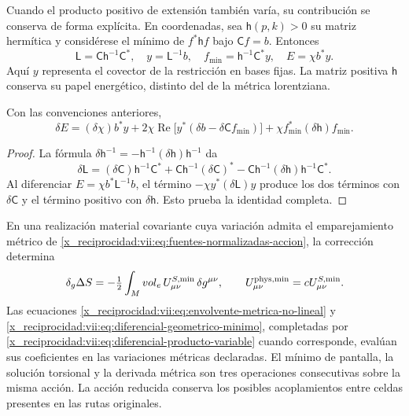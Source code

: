 Cuando el producto positivo de extensión también varía, su
contribución se conserva de forma explícita. En coordenadas, sea
\(\mathsf h(p,k)>0\) su matriz hermítica y considérese el mínimo
de \(f^*\mathsf h f\) bajo \(\mathsf C f=b\). Entonces
\begin{equation}
 \mathsf L=\mathsf C\mathsf h^{-1}\mathsf C^*,\quad
 y=\mathsf L^{-1}b,\quad
 f_{\min}=\mathsf h^{-1}\mathsf C^*y,\quad
 E=\chi b^*y.
 \label{x_reciprocidad:vii:eq:minimo-producto-variable}
\end{equation}
Aquí \(y\) representa el covector de la restricción en bases
fijas. La matriz positiva \(\mathsf h\) conserva su papel
energético, distinto del de la métrica lorentziana.

\begin{lemma}
\label{x_reciprocidad:vii:lem:producto-variable-extension}
Con las convenciones anteriores,
\begin{equation}
 \delta E=(\delta\chi)b^*y
   +2\chi\operatorname{Re}\bigl[y^*(\delta b-\delta\mathsf C f_{\min})\bigr]
   +\chi f_{\min}^*(\delta\mathsf h)f_{\min}.
 \label{x_reciprocidad:vii:eq:diferencial-producto-variable}
\end{equation}
\end{lemma}
\begin{proof}
La fórmula \(\delta\mathsf h^{-1}
=-\mathsf h^{-1}(\delta\mathsf h)\mathsf h^{-1}\) da
\[
 \delta\mathsf L=(\delta\mathsf C)\mathsf h^{-1}\mathsf C^*
 +\mathsf C\mathsf h^{-1}(\delta\mathsf C)^*
 -\mathsf C\mathsf h^{-1}(\delta\mathsf h)
                              \mathsf h^{-1}\mathsf C^*.
\]
Al diferenciar \(E=\chi b^*\mathsf L^{-1}b\), el término
\(-\chi y^*(\delta\mathsf L)y\) produce los dos términos
con \(\delta\mathsf C\) y el término positivo con
\(\delta\mathsf h\). Esto prueba la identidad completa.
\end{proof}

En una realización material covariante cuya variación admita el
emparejamiento métrico de
\eqref{x_reciprocidad:vii:eq:fuentes-normalizadas-accion}, la corrección determina
\begin{equation}
 \delta_g\Delta S
 =-\tfrac12\int_M\operatorname{vol}_e\,
          \mathcal U^{S,\min}_{\mu\nu}\,\delta g^{\mu\nu},
 \qquad U^{\rm phys,\min}_{\mu\nu}
                      =c\mathcal U^{S,\min}_{\mu\nu}.
 \label{x_reciprocidad:vii:eq:fuente-metrica-minimo-no-lineal}
\end{equation}
Las ecuaciones \eqref{x_reciprocidad:vii:eq:envolvente-metrica-no-lineal} y
\eqref{x_reciprocidad:vii:eq:diferencial-geometrico-minimo}, completadas por
\eqref{x_reciprocidad:vii:eq:diferencial-producto-variable} cuando corresponde,
evalúan sus coeficientes en las variaciones métricas declaradas.
El mínimo de pantalla, la solución torsional y la derivada métrica
son tres operaciones consecutivas sobre la misma acción.
La acción reducida conserva los posibles acoplamientos entre
celdas presentes en las rutas originales.

